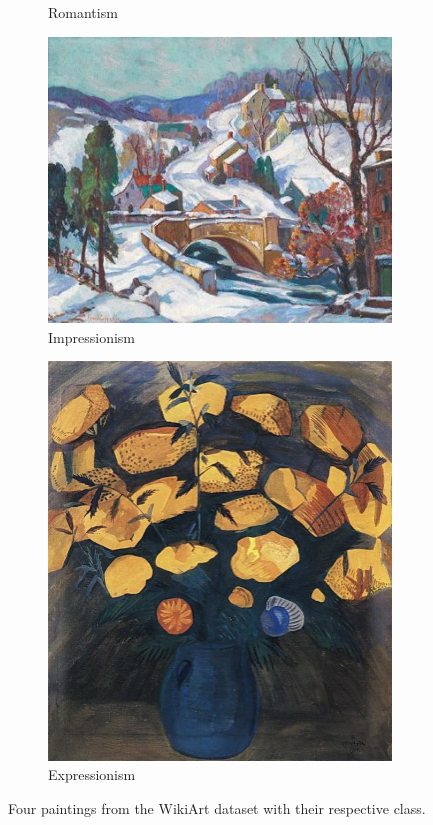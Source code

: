 \documentclass{article}
\begin{document}
\begin{figure}[hbt!]
\begin{subfigure}{.28\textwidth}
		\caption{Romantism}
		\label{energydetPSK}
	\end{subfigure}	
	\medskip
	\hfil
	\begin{subfigure}{.36\textwidth}
		\includegraphics[width=\linewidth]{images/fern-coppedge_january-sunshine.jpg}
		\caption{Impressionism}
		\label{velcomp}
	\end{subfigure}
	\hfil
	\begin{subfigure}{.28\textwidth}
		\includegraphics[width=\linewidth]{images/martiros-saryan_yellow-flowers-1914.jpg}
		\caption{Expressionism}
		\label{estcomp}
	\end{subfigure}
	\hfil	
	\caption{Four paintings from the WikiArt dataset with their respective class.}
	\label{fig:wikiart}
\end{figure}
\end{document}
